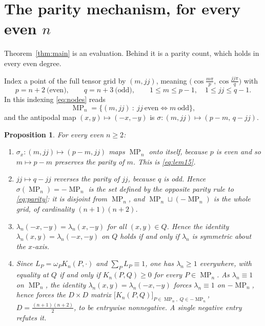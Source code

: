\documentclass[11pt]{amsart}
\newtheorem{proposition}[theorem]{Proposition}
\DeclareMathOperator{\MP}{MP}
\newcommand{\Q}{Q}
\begin{document}
\section{The parity mechanism, for every even \texorpdfstring{$n$}{n}}

Theorem~\ref{thm:main} is an evaluation. Behind it is a parity count, which
holds in every even degree.

Index a point of the full tensor grid by $(m,jj)$, meaning
$\bigl(\cos\frac{m\pi}p,\cos\frac{jj\pi}q\bigr)$ with
\[
  p=n+2\ \text{(even)},\qquad q=n+3\ \text{(odd)},\qquad
  1\le m\le p-1,\quad 1\le jj\le q-1 .
\]
In this indexing \eqref{eq:nodes} reads
\begin{equation}\label{eq:parity}
  \MP_n=\bigl\{(m,jj)\ :\ jj\ \text{even}\iff m\ \text{odd}\bigr\},
\end{equation}
and the antipodal map $(x,y)\mapsto(-x,-y)$ is
$\sigma:(m,jj)\mapsto(p-m,\,q-jj)$.

\begin{proposition}\label{prop:mech}
For every even $n\ge2$:
\begin{enumerate}
\item $\sigma_x:(m,jj)\mapsto(p-m,jj)$ maps $\MP_n$ onto itself, because $p$ is
      even and so $m\mapsto p-m$ preserves the parity of $m$. This is
      \eqref{eq:lem15}.
\item $jj\mapsto q-jj$ reverses the parity of $jj$, because $q$ is odd. Hence
      $\sigma(\MP_n)=-\MP_n$ is the set defined by the opposite parity rule to
      \eqref{eq:parity}: it is \emph{disjoint} from $\MP_n$, and
      $\MP_n\sqcup(-\MP_n)$ is the whole grid, of cardinality $(n+1)(n+2)$.
\item $\lambda_n(-x,-y)=\lambda_n(x,-y)$ for all $(x,y)\in\Q$. Hence the
      identity $\lambda_n(x,y)=\lambda_n(-x,-y)$ on $\Q$ holds if and only if
      $\lambda_n$ is symmetric about the $x$-axis.
\item Since $L_P=\omega_PK_n(P,\cdot)$ and $\sum_PL_P\equiv1$, one has
      $\lambda_n\ge1$ everywhere, with equality at $Q$ if and only if
      $K_n(P,Q)\ge0$ for every $P\in\MP_n$. As $\lambda_n\equiv1$ on $\MP_n$,
      the identity $\lambda_n(x,y)=\lambda_n(-x,-y)$ forces $\lambda_n\equiv1$
      on $-\MP_n$, hence forces the $D\times D$ matrix
      $\bigl[K_n(P,Q)\bigr]_{P\in\MP_n,\;Q\in-\MP_n}$,
      $D=\frac{(n+1)(n+2)}2$, to be entrywise nonnegative. A single negative
      entry refutes it.
\end{enumerate}
\end{proposition}
\end{document}
